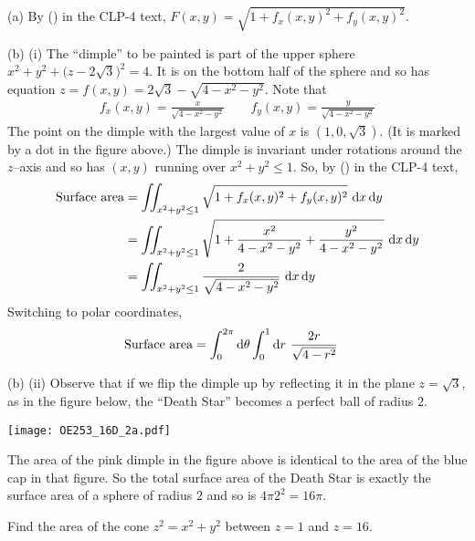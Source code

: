 \begin{solution}
(a)
By () in the CLP-4 text,
$F(x,y) = \sqrt{1+f_x(x,y)^2+f_y(x,y)^2}$.

(b)  (i) The ``dimple'' to be painted is part of the upper sphere
$x^2+y^2+\big(z-2\sqrt{3}\big)^2=4$. It is on the bottom half of the sphere
and so has equation $z=f(x,y)=2\sqrt{3}-\sqrt{4-x^2-y^2}$. Note that
\begin{align*}
f_x(x,y) = \frac{x}{\sqrt{4-x^2-y^2}}\qquad
f_y(x,y) = \frac{y}{\sqrt{4-x^2-y^2}}
\end{align*}
The point on the dimple with the largest value of $x$ is
$(1,0,\sqrt{3})$. (It is marked by a dot in the figure above.) The dimple
is invariant under rotations around the $z$--axis and so has $(x,y)$
running over $x^2+y^2\le 1$. So, by 
() in the CLP-4 text,
\begin{align*}
\text{Surface area}
&= \dblInt_{x^2+y^2\le 1}\sqrt{1+f_x(x,y)^2+f_y(x,y)^2}\ \dee{x}\,\dee{y} \\
&= \dblInt_{x^2+y^2\le 1}\sqrt{1+\frac{x^2}{4-x^2-y^2}
                                +\frac{y^2}{4-x^2-y^2}}\ \dee{x}\,\dee{y} \\
&= \dblInt_{x^2+y^2\le 1}\frac{2}{\sqrt{4-x^2-y^2}}\ \dee{x}\,\dee{y} 
\end{align*}
Switching to polar coordinates,
\begin{align*}
\text{Surface area}
&= \int_0^{2\pi}\mathrm{d}\theta\int_0^1\mathrm{d}r\ \frac{2r}{\sqrt{4-r^2}}
\end{align*}

(b) (ii) Observe that if we flip the dimple up by reflecting it
in the plane $z=\sqrt{3}$, as in the figure below, the ``Death Star'' 
becomes a perfect ball of radius $2$.  
\begin{center}
     \texttt{[image: OE253\_16D\_2a.pdf]}
\end{center}
The area of the pink dimple in the figure above is identical to the area
of the blue cap in that figure. So the total surface area of the 
Death Star is exactly the surface area of a sphere of radius $2$ and so
is $4\pi 2^2=16\pi$.

\end{solution}

\begin{question} [M200 2003A] %
Find the area of the cone $z^2=x^2+y^2$ between $z=1$ and $z=16$.
\end{question}

